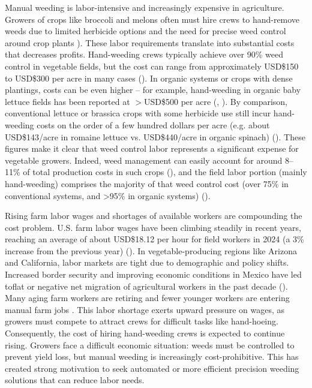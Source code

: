 \documentclass[letterpaper]{report}
\begin{document}
Manual weeding is labor-intensive and increasingly expensive in agriculture. Growers of crops like broccoli and melons often must hire crews to hand-remove weeds due to limited herbicide options and the need for precise weed control around crop plants \cite{American-Society-of-Agronomy2018-ad}). These labor requirements translate into substantial costs that decreases profits. Hand-weeding crews typically achieve over 90\% weed control in vegetable fields, but the cost can range from approximately USD\$150 to USD\$300 per acre in many cases (\cite{American-Society-of-Agronomy2018-ad}). In organic systems or crops with dense plantings, costs can be even higher – for example, hand-weeding in organic baby lettuce fields has been reported at $>$USD\$500 per acre (\cite{Fennimore2014-dc}, \cite{Kushal2024-jt}). By comparison, conventional lettuce or brassica crops with some herbicide use still incur hand-weeding costs on the order of a few hundred dollars per acre (e.g. about USD\$143/acre in romaine lettuce vs. USD\$440/acre in organic spinach) (\cite{Laura-Tourte2016-tf}). These figures make it clear that weed control labor represents a significant expense for vegetable growers. Indeed, weed management can easily account for around 8–11\% of total production costs in such crops (\cite{Laura-Tourte2016-tf}), and the field labor portion (mainly hand-weeding) comprises the majority of that weed control cost (over 75\% in conventional systems, and >95\% in organic systems) (\cite{Laura-Tourte2016-tf}).

Rising farm labor wages and shortages of available workers are compounding the cost problem. U.S. farm labor wages have been climbing steadily in recent years, reaching an average of about USD\$18.12 per hour for field workers in 2024 (a 3\% increase from the previous year) (\cite{USDA2024-pq}). In vegetable-producing regions like Arizona and California, labor markets are tight due to demographic and policy shifts. Increased border security and improving economic conditions in Mexico have led toflat or negative net migration of agricultural workers in the past decade (\cite{Laura-Tourte2016-tf}). Many aging farm workers are retiring and fewer younger workers are entering manual farm jobs . This labor shortage exerts upward pressure on wages, as growers must compete to attract crews for difficult tasks like hand-hoeing. Consequently, the cost of hiring hand-weeding crews is expected to continue rising. Growers face a difficult economic situation: weeds must be controlled to prevent yield loss, but manual weeding is increasingly cost-prohibitive. This has created strong motivation to seek automated or more efficient precision weeding solutions that can reduce labor needs.
\end{document}
